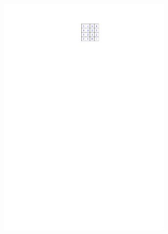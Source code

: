 \documentclass[letterpaper]{article}
\theoremstyle{definition}
\begin{document}
\begin{figure}[t]
\begin{subfigure}[b]{0.12\textwidth}
	\includegraphics[width=0.95\textwidth]{Figs/example1_a2_h.pdf}
    \caption{}
  \end{subfigure}
  \begin{subfigure}[b]{0.12\textwidth}
    \centering

\end{subfigure}
\end{figure}
\end{document}
